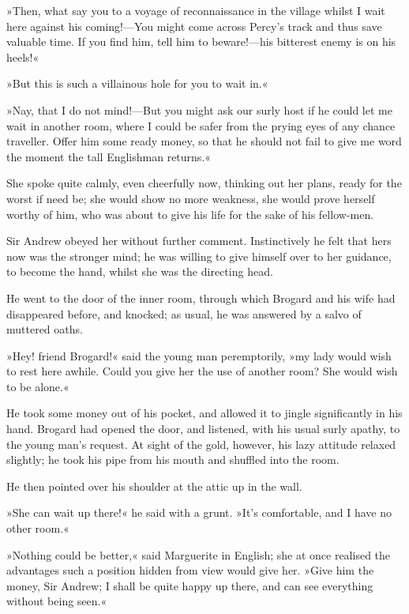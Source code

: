 »Then, what say you to a voyage of reconnaissance in the village whilst I wait here against his coming!\allowbreak---\allowbreak You might come across Percy's track and thus save valuable time. If you find him, tell him to beware!\allowbreak---\allowbreak his bitterest enemy is on his heels!«

»But this is such a villainous hole for you to wait in.«

»Nay, that I do not mind!\allowbreak---\allowbreak But you might ask our surly host if he could let me wait in another room, where I could be safer from the prying eyes of any chance traveller. Offer him some ready money, so that he should not fail to give me word the moment the tall Englishman returns.«

She spoke quite calmly, even cheerfully now, thinking out her plans, ready for the worst if need be; she would show no more weakness, she would prove herself worthy of him, who was about to give his life for the sake of his fellow-men.

Sir Andrew obeyed her without further comment. Instinctively he felt that hers now was the stronger mind; he was willing to give himself over to her guidance, to become the hand, whilst she was the directing head.

He went to the door of the inner room, through which Brogard and his wife had disappeared before, and knocked; as usual, he was answered by a salvo of muttered oaths.

»Hey! friend Brogard!« said the young man peremptorily, »my lady would wish to rest here awhile. Could you give her the use of another room? She would wish to be alone.«

He took some money out of his pocket, and allowed it to jingle significantly in his hand. Brogard had opened the door, and listened, with his usual surly apathy, to the young man's request. At sight of the gold, however, his lazy attitude relaxed slightly; he took his pipe from his mouth and shuffled into the room.

He then pointed over his shoulder at the attic up in the wall.

»She can wait up there!« he said with a grunt. »It's comfortable, and I have no other room.«

»Nothing could be better,« said Marguerite in English; she at once realised the advantages such a position hidden from view would give her. »Give him the money, Sir Andrew; I shall be quite happy up there, and can see everything without being seen.«

